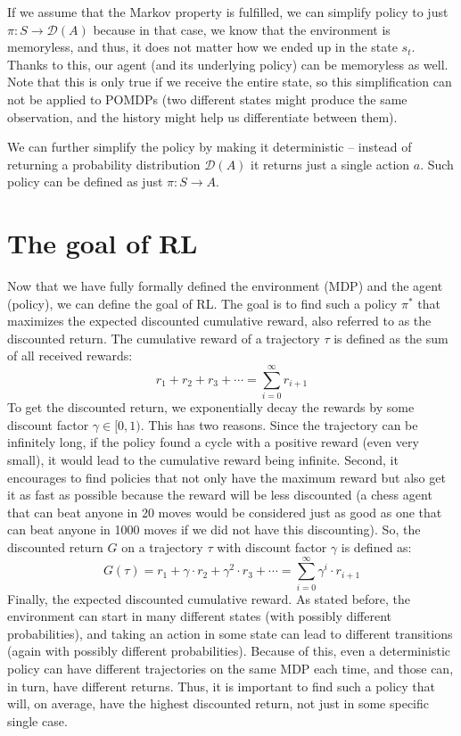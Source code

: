 \documentclass[
  digital,     %
  oneside,     %
  nosansbold,  %
  nocolorbold, %
  lof,         %
  lot,         %
]{fithesis4}
\begin{document}
If we assume that the Markov property is fulfilled, we can simplify policy to just $\pi\colon S \to \mathcal{D}(A)$ because in that case, we know that the environment is memoryless, and thus, it does not matter how we ended up in the state $s_t$. Thanks to this, our agent (and its underlying policy) can be memoryless as well. Note that this is only true if we receive the entire state, so this simplification can not be applied to POMDPs (two different states might produce the same observation, and the history might help us differentiate between them).

We can further simplify the policy by making it deterministic -- instead of returning a probability distribution $\mathcal{D}(A)$ it returns just a single action $a$. Such policy can be defined as just $\pi\colon S \to A$.

\section{The goal of RL}
Now that we have fully formally defined the environment (MDP) and the agent (policy), we can define the goal of RL. The goal is to find such a policy $\pi^*$ that maximizes the expected discounted cumulative reward, also referred to as the discounted return. The cumulative reward of a trajectory $\tau$ is defined as the sum of all received rewards:
\[
r_1+r_2+r_3+\dotsb = \sum_{i=0}^{\infty} r_{i+1}
\]
To get the discounted return, we exponentially decay the rewards by some discount factor $\gamma \in [0,1)$. This has two reasons. Since the trajectory can be infinitely long, if the policy found a cycle with a positive reward (even very small), it would lead to the cumulative reward being infinite. Second, it encourages to find policies that not only have the maximum reward but also get it as fast as possible because the reward will be less discounted (a chess agent that can beat anyone in 20 moves would be considered just as good as one that can beat anyone in 1000 moves if we did not have this discounting). So, the discounted return $G$ on a trajectory $\tau$ with discount factor $\gamma$ is defined as:
\[
G(\tau)=r_1+\gamma \cdot r_2+ \gamma^2 \cdot r_3+\dotsb = \sum_{i=0}^{\infty} \gamma^i\cdot r_{i+1}
\]
Finally, the expected discounted cumulative reward. As stated before, the environment can start in many different states (with possibly different probabilities), and taking an action in some state can lead to different transitions (again with possibly different probabilities). Because of this, even a deterministic policy can have different trajectories on the same MDP each time, and those can, in turn, have different returns. Thus, it is important to find such a policy that will, on average, have the highest discounted return, not just in some specific single case.
\end{document}
